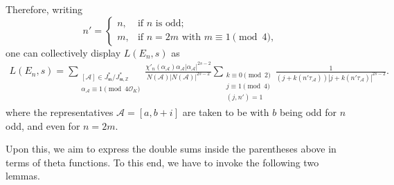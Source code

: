 \documentclass[11pt, reqno]{amsart}
\theoremstyle{plain}
\theoremstyle{definition}
\numberwithin{equation}{section}
\begin{document}
Therefore, writing
$$
n'=\begin{cases}
    n,&\mbox{if $n$ is odd;}\\
    m,&\mbox{if $n=2m$ with $m\equiv 1\pmod{4}$,}
\end{cases}
$$
one can collectively display $L(E_{n},s)$ as
\begin{align}\label{Ls1}
   L(E_{n},s) =\sum_{\substack{[\mathcal{A}]\in J_{\mathfrak{m}}^{*}/J_{\mathfrak{m},\mathbb{Z}}^{*}\\\alpha_{\mathcal{A}}\equiv1\pmod{4\mathcal{O}_{K}}}} \frac{\chi'_{n}(\alpha_{\mathcal{A}})\alpha_{\mathcal{A}}|\alpha_{\mathcal{A}}|^{2s-2}}{N(\mathcal{A})|N(\mathcal{A})|^{2s-2}}\sum_{\substack{k\equiv0\pmod{2}\\j\equiv1\pmod{4}\\(j,n')=1}}\frac{1}{(j+k(n'\tau_{\mathcal{A}}))|j+k(n'\tau_{\mathcal{A}})|^{2s-2}}.
\end{align}
where  the representatives $\mathcal{A}=[a,b+i]$ are taken to be with $b$ being odd for $n$ odd, and even for $n=2m$. 

Upon this, we aim to express the double sums inside the parentheses above in terms of theta functions. To this end, we have to invoke the following two lemmas.
\end{document}
